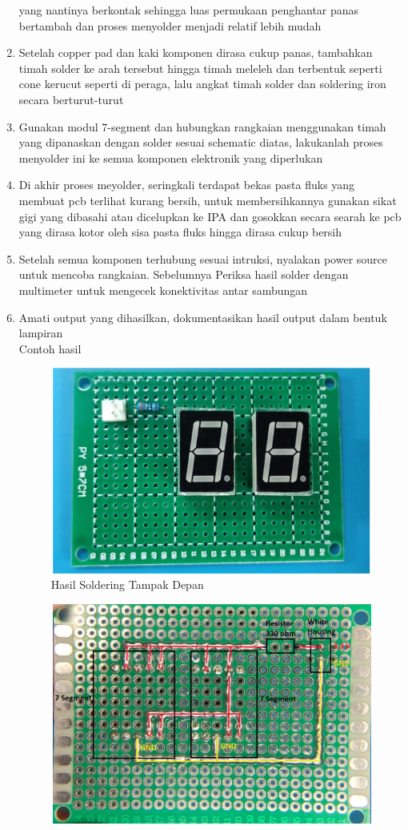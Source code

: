 \begin{enumerate}
    yang nantinya berkontak sehingga luas permukaan penghantar panas bertambah dan proses menyolder menjadi relatif lebih mudah
    \item Setelah copper pad dan kaki komponen dirasa cukup panas, tambahkan timah solder ke arah tersebut hingga timah meleleh dan terbentuk seperti cone kerucut seperti di peraga, lalu angkat timah solder dan soldering iron secara berturut-turut
    \item Gunakan modul 7-segment dan hubungkan rangkaian menggunakan timah yang dipanaskan dengan solder sesuai schematic diatas, lakukanlah proses menyolder ini ke semua komponen elektronik yang diperlukan
    \item Di akhir proses meyolder, seringkali terdapat bekas pasta fluks yang membuat pcb terlihat kurang bersih, untuk membersihkannya gunakan sikat gigi yang dibasahi atau dicelupkan ke IPA dan gosokkan secara searah ke pcb yang dirasa kotor oleh sisa pasta fluks hingga dirasa cukup bersih
    \item Setelah semua komponen terhubung sesuai intruksi, nyalakan power source untuk mencoba rangkaian. Sebelumnya Periksa hasil solder dengan multimeter untuk mengecek konektivitas antar sambungan
    \item Amati output yang dihasilkan, dokumentasikan hasil output dalam bentuk lampiran
        \\ Contoh hasil
        \begin{figure}[H]
            \centering
            \includegraphics[width=0.8\linewidth]{P2/img/contohhasil1.png}
            \caption{Hasil Soldering Tampak Depan}
            \label{fig:HasilTampakDepan}
        \end{figure}
        \begin{figure}[H]
            \centering
            \includegraphics[width=0.8\linewidth]{P2/img/contohhasil2.png}

\end{figure}
\end{enumerate}
